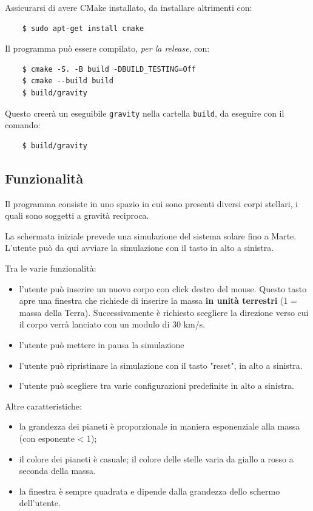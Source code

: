 \documentclass{article}
\begin{document}
Assicurarsi di avere CMake installato, da installare altrimenti con:
\begin{verbatim}
    $ sudo apt-get install cmake
\end{verbatim}

Il programma può essere compilato, \textit{per la release}, con:
\begin{verbatim}
    $ cmake -S. -B build -DBUILD_TESTING=Off
    $ cmake --build build
    $ build/gravity
\end{verbatim}

Questo creerà un eseguibile \verb|gravity| nella cartella \verb|build|, da eseguire con il comando:
\begin{verbatim}
    $ build/gravity
\end{verbatim}

\subsection{Funzionalità}
Il programma consiste in uno spazio in cui sono presenti diversi corpi stellari, i quali sono soggetti a gravità reciproca.

La schermata iniziale prevede una simulazione del sistema solare fino a Marte. L'utente può da qui avviare la simulazione con il tasto in alto a sinistra. 

Tra le varie funzionalità:
\begin{itemize}
    \item l'utente può inserire un nuovo corpo con click destro del mouse. Questo tasto apre una finestra che richiede di inserire la massa \textbf{in unità terrestri} (1 = massa della Terra). Successivamente è richiesto scegliere la direzione verso cui il corpo verrà lanciato con un modulo di 30 km/s.
    \item l'utente può mettere in pausa la simulazione
    \item l'utente può ripristinare la simulazione con il tasto "reset", in alto a sinistra.
    \item l'utente può scegliere tra varie configurazioni predefinite in alto a sinistra.
\end{itemize}

Altre caratteristiche:
\begin{itemize}
    \item la grandezza dei pianeti è proporzionale in maniera esponenziale alla massa (con esponente < 1);
    \item il colore dei pianeti è casuale; il colore delle stelle varia da giallo a rosso a seconda della massa.
    \item la finestra è sempre quadrata e dipende dalla grandezza dello schermo dell'utente.
\end{itemize}
\end{document}
